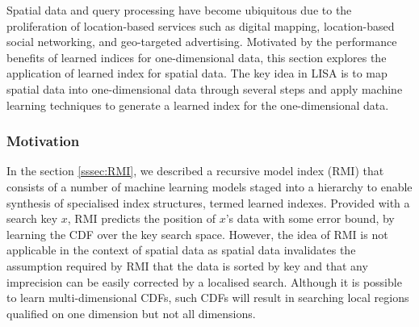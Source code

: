 Spatial data and query processing have become ubiquitous due to the proliferation of location-based services such as digital mapping, location-based social networking, and geo-targeted advertising. Motivated by the performance benefits of learned indices for one-dimensional data, this section explores the application of learned index for spatial data. The key idea in LISA \cite{li2020lisa} is to map spatial data into one-dimensional data through several steps and apply machine learning techniques to generate a learned index for the one-dimensional data.

\subsubsection{Motivation}

In the section \ref{sssec:RMI}, we described a recursive model index (RMI) that consists of a number of machine learning models staged into a hierarchy to enable synthesis of specialised index structures, termed learned indexes. Provided with a search key $x$, RMI predicts the position of $x$'s data with some error bound, by learning the CDF over the key search space. However, the idea of RMI is not applicable in the context of spatial data as spatial data invalidates the assumption required by RMI that the data is sorted by key and that any imprecision can be easily corrected by a localised search. Although it is possible to learn multi-dimensional CDFs, such CDFs will result in searching local regions qualified on one dimension but not all dimensions.


